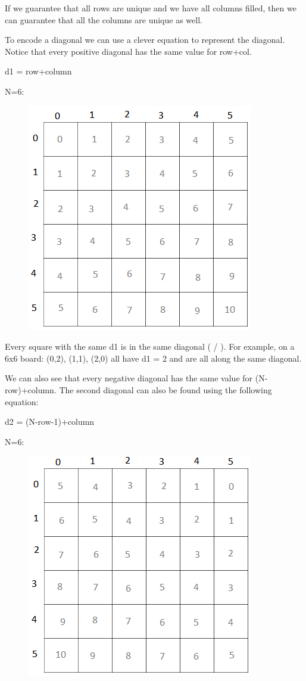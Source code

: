 \documentclass[11pt,oneside]{book}
\makeatletter
\def\maxwidth#1{\ifdim\Gin@nat@width>#1 #1\else\Gin@nat@width\fi}
\makeatother
\begin{document}
If we guarantee that all rows are unique and we have all columns filled, then we can guarantee that all the columns are unique as well.

To encode a diagonal we can use a clever equation to represent the diagonal. Notice that every positive diagonal has the same value for row+col.

d1 = row+column

N=6:

\vspace{5px}\begin{figure}[H]\centering
        \includegraphics[width=0.66\maxwidth{\textwidth}]{nqueen1.png}
        \end{figure}

Every square with the same d1 is in the same diagonal ( / ). For example, on a 6x6 board: (0,2), (1,1), (2,0) all have d1 = 2 and are all along the same diagonal.

We can also see that every negative diagonal has the same value for (N-row)+column. The second diagonal can also be found using the following equation:

d2 = (N-row-1)+column

N=6:

\vspace{5px}\begin{figure}[H]\centering
        \includegraphics[width=0.66\maxwidth{\textwidth}]{nqueen2.png}
        \end{figure}
\end{document}
